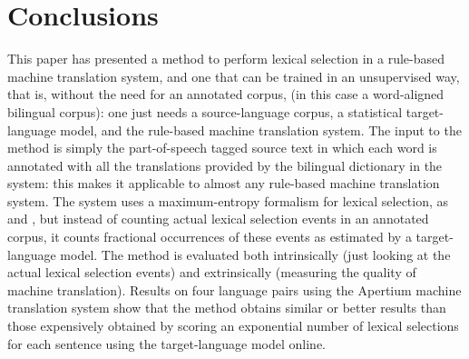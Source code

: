 \documentclass[11pt]{article}
\newcommand{\comment}[1]{\todo{#1}}
\begin{document}
\section{Conclusions}

This paper has
presented a method to perform lexical selection in a rule-based
machine translation system, and one that can be trained in an
unsupervised way, that is, without the need for an annotated corpus,
(in this case a word-aligned bilingual corpus): one just needs a
source-language corpus, a statistical target-language model, and the
rule-based machine translation system. The input to the method is
simply the part-of-speech tagged source text in which each word is
annotated with all the translations provided by the bilingual
dictionary in the system: this makes it applicable to almost any
rule-based machine translation system. The system uses a
maximum-entropy formalism for lexical selection, as \cite{berger1996}
and \cite{marechek10}, but instead of counting actual lexical
selection events in an annotated corpus, it counts fractional
occurrences of these events as estimated by a target-language
model. The method is evaluated both intrinsically (just looking at the
actual lexical selection events) and extrinsically (measuring the
quality of machine translation). Results on four language pairs using
the Apertium \citep{forcada2011apertium} machine translation system
show that the method obtains similar or better results than those
expensively obtained by scoring an exponential number of lexical
selections for each sentence using the target-language model online.

\end{document}
